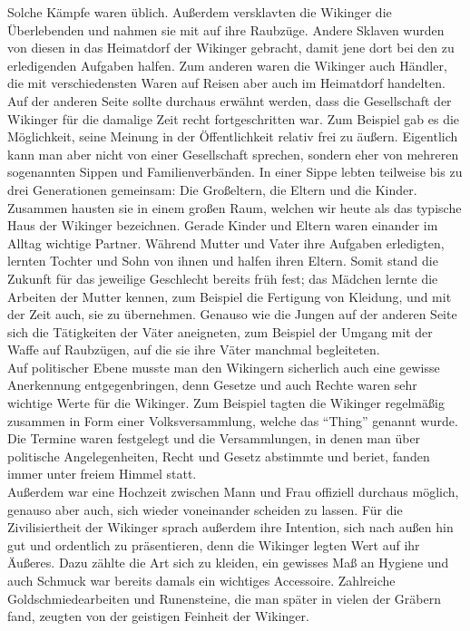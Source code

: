 \documentclass[12pt,a4paper,ngerman,openany]{book}
\begin{document}
Solche Kämpfe waren üblich. Außerdem versklavten die Wikinger die Überlebenden und nahmen sie mit auf ihre Raubzüge. Andere Sklaven wurden von diesen in das Heimatdorf der Wikinger gebracht, damit jene dort bei den zu erledigenden Aufgaben halfen.
Zum anderen waren die Wikinger auch Händler, die mit verschiedensten Waren auf Reisen aber auch im Heimatdorf handelten.\\
Auf der anderen Seite sollte durchaus erwähnt werden, dass die Gesellschaft der Wikinger für die damalige Zeit recht fortgeschritten war. Zum Beispiel gab es die Möglichkeit, seine Meinung in der Öffentlichkeit relativ frei zu äußern.
Eigentlich kann man aber nicht von einer Gesellschaft sprechen, sondern eher von mehreren sogenannten Sippen und Familienverbänden. In einer Sippe lebten teilweise bis zu drei Generationen gemeinsam: Die Großeltern, die Eltern und die Kinder.
Zusammen hausten sie in einem großen Raum, welchen wir heute als das typische Haus der Wikinger bezeichnen. Gerade Kinder und Eltern waren einander im Alltag wichtige Partner. Während Mutter und Vater ihre Aufgaben erledigten,
lernten Tochter und Sohn von ihnen und halfen ihren Eltern. Somit stand die Zukunft für das jeweilige Geschlecht bereits früh fest; das Mädchen lernte die Arbeiten der Mutter kennen, zum Beispiel die Fertigung von Kleidung, und mit der Zeit auch, sie zu übernehmen.
Genauso wie die Jungen auf der anderen Seite sich die Tätigkeiten der Väter aneigneten, zum Beispiel der Umgang mit der Waffe auf Raubzügen, auf die sie ihre Väter manchmal begleiteten.\\
Auf politischer Ebene musste man den Wikingern sicherlich auch eine gewisse Anerkennung entgegenbringen, denn Gesetze und auch Rechte waren sehr wichtige Werte für die Wikinger. Zum Beispiel tagten die Wikinger regelmäßig zusammen in Form einer Volksversammlung,
welche das “Thing” genannt wurde. Die Termine waren festgelegt und die Versammlungen, in denen man über politische Angelegenheiten, Recht und Gesetz abstimmte und beriet, fanden immer unter freiem Himmel statt.\\
Außerdem war eine Hochzeit zwischen Mann und Frau offiziell durchaus möglich, genauso aber auch, sich wieder voneinander scheiden zu lassen. 
Für die Zivilisiertheit der Wikinger sprach außerdem ihre Intention, sich nach außen hin gut und ordentlich zu präsentieren, denn die Wikinger legten Wert auf ihr Äußeres. Dazu zählte die Art sich zu kleiden,
ein gewisses Maß an Hygiene und auch Schmuck war bereits damals ein wichtiges Accessoire. Zahlreiche Goldschmiedearbeiten und Runensteine, die man später in vielen der Gräbern fand, zeugten von der geistigen Feinheit der Wikinger. 
\end{document}
